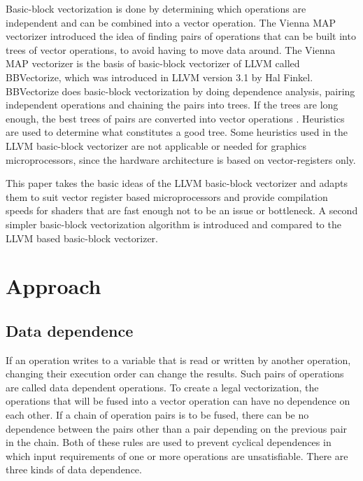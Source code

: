 \documentclass[12pt,a4paper,onecolumn,twoside,openright]{report}
\begin{document}
Basic-block vectorization is done by determining which operations are independent and can be combined into a vector operation. The Vienna MAP vectorizer \cite{lorenz2005vectorization} introduced the idea of finding pairs of operations that can be built into trees of vector operations, to avoid having to move data around. The Vienna MAP vectorizer is the basis of basic-block vectorizer of LLVM called BBVectorize, which was introduced in LLVM version 3.1 by Hal Finkel. BBVectorize does basic-block vectorization by doing dependence analysis, pairing independent operations and chaining the pairs into trees. If the trees are long enough, the best trees of pairs are converted into vector operations \cite{finkel2012bbvectorize}. Heuristics are used to determine what constitutes a good tree. Some heuristics used in the LLVM basic-block vectorizer are not applicable or needed for graphics microprocessors, since the hardware architecture is based on vector-registers only.


This paper takes the basic ideas of the LLVM basic-block vectorizer and adapts them to suit vector register based microprocessors and provide compilation speeds for shaders that are fast enough not to be an issue or bottleneck.
A second simpler basic-block vectorization algorithm is introduced and compared to the LLVM based basic-block vectorizer.


\chapter{Approach}
 \label{chap:approach}

\section{Data dependence}
If an operation writes to a variable that is read or written by another operation, changing their execution order can change the results. Such pairs of operations are called data dependent operations. 
To create a legal vectorization, the operations that will be fused into a vector operation can have no dependence on each other. If a chain of operation pairs is to be fused, there can be no dependence between the pairs other than a pair depending on the previous pair in the chain. Both of these rules are used to prevent cyclical dependences in which input requirements of one or more operations are unsatisfiable.
There are three kinds of data dependence\cite{aho2007compilers}\cite{kuck1981dependence}.
\end{document}
